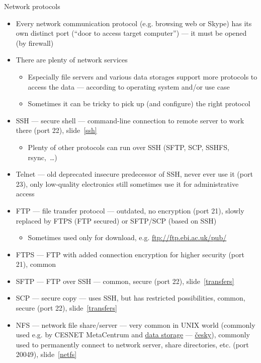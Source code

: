 \documentclass[compress, xelatex, 11pt, xcolor=svgnames, aspectratio=169,
	hyperref={
		bookmarks=true,
		unicode=true,
		colorlinks=true,
		pdftitle={Linux, command line and MetaCentrum},
		plainpages=false,
		pdfauthor={Vojtech Zeisek},
		pdfsubject={Course about use of Linux command line, writing shell scripts and using MetaCentrum of CESNET},
		pdfcreator={XeLaTeX},
		pdfkeywords={Linux, GNU, BASH, shell, command line, MetaCentrum},
		linkcolor=DarkRed, %
		anchorcolor=DarkBlue, %
		citecolor=Indigo, %
		filecolor=NavyBlue, %
		menucolor=DarkMagenta, %
		urlcolor=DarkBlue, %
		},
	url={hyphens, lowtilde} %
	]{beamer}
\begin{document}
\begin{frame}[allowframebreaks]{Network protocols}
	\begin{itemize}
		\item Every network communication protocol (e.g. browsing web or Skype) has its own distinct port (\enquote{door to access target computer}) --- it must be opened (by firewall)
		\item There are plenty of network services
		\begin{itemize}
			\item Especially file servers and various data storages support more protocols to access the data --- according to operating system and/or use case
			\item Sometimes it can be tricky to pick up (and configure) the right protocol
		\end{itemize}
		\item SSH --- secure shell --- command-line connection to remote server to work there (port 22), slide~\ref{ssh}
		\begin{itemize}
			\item Plenty of other protocols can run over SSH (SFTP, SCP, SSHFS, rsync,~\ldots)
		\end{itemize}
		\item Telnet --- old deprecated insecure predecessor of SSH, never ever use it (port 23), only low-quality electronics still sometimes use it for administrative access
		\item FTP --- file transfer protocol --- outdated, no encryption (port 21), slowly replaced by FTPS (FTP secured) or SFTP/SCP (based on SSH)
		\begin{itemize}
			\item Sometimes used only for download, e.g. \url{ftp://ftp.ebi.ac.uk/pub/}
		\end{itemize}
		\item FTPS --- FTP with added connection encryption for higher security (port 21), common
		\item SFTP --- FTP over SSH --- common, secure (port 22), slide~\ref{transfers}
		\item SCP --- secure copy --- uses SSH, but has restricted possibilities, common, secure (port 22), slide~\ref{transfers}
		\item NFS --- network file share/server --- very common in UNIX world (commonly used e.g. by CESNET MetaCentrum and \href{https://du.cesnet.cz/en/navody/nfs/start}{data storage} --- \href{https://du.cesnet.cz/cs/navody/nfs/start}{česky}), commonly used to permanently connect to network server, share directories, etc. (port 20049), slide~\ref{netfs}

\end{itemize}
\end{frame}
\end{document}
